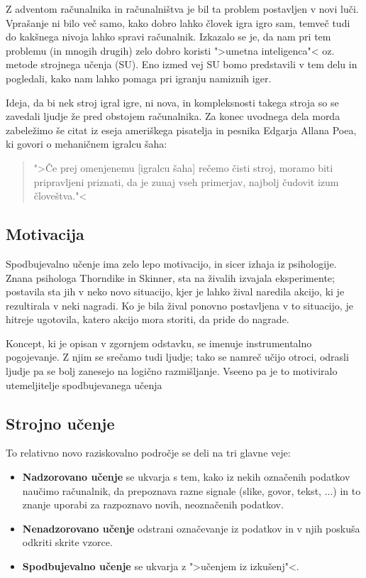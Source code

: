 \documentclass[12pt,a4paper]{amsart}
\theoremstyle{definition} %
\theoremstyle{plain} %
\begin{document}
Z adventom računalnika in računalništva je bil ta problem postavljen v novi luči. Vprašanje
ni bilo več samo, kako dobro lahko človek igra igro sam, temveč tudi do kakšnega nivoja 
lahko spravi računalnik. Izkazalo se je, da nam pri tem problemu (in mnogih drugih) zelo dobro
koristi ">umetna inteligenca"< oz. metode strojnega učenja (SU). Eno izmed vej SU bomo 
predstavili v tem delu in pogledali, kako nam lahko pomaga pri igranju namiznih iger.

Ideja, da bi nek stroj igral igre, ni nova, in kompleksnosti takega stroja so se zavedali ljudje
že pred obstojem računalnika. 
Za konec uvodnega dela morda zabeležimo še citat iz eseja ameriškega pisatelja in pesnika 
Edgarja Allana Poea, ki govori o mehaničnem igralcu šaha: 

\begin{quotation}
    ">Če prej omenjenemu [igralcu šaha] rečemo čisti stroj, moramo biti pripravljeni priznati, da je
    zunaj vseh primerjav, najbolj čudovit izum človeštva."<
\end{quotation}

\subsection{Motivacija}
Spodbujevalno učenje ima zelo lepo motivacijo, in sicer izhaja iz psihologije. Znana psihologa 
Thorndike in Skinner, sta na živalih izvajala eksperimente; postavila sta jih v neko novo 
situacijo, kjer je lahko žival naredila akcijo, ki je rezultirala v neki nagradi. Ko je bila
žival ponovno postavljena v to situacijo, je hitreje ugotovila, katero akcijo mora storiti, da
pride do nagrade.

Koncept, ki je opisan v zgornjem odstavku, se imenuje instrumentalno pogojevanje. Z njim se 
srečamo tudi ljudje; tako se namreč učijo otroci, odrasli ljudje pa se bolj zanesejo na 
logično razmišljanje. Vseeno pa je to motiviralo utemeljitelje spodbujevanega učenja

\subsection{Strojno učenje}
To relativno novo raziskovalno področje se deli na tri glavne veje:
\begin{itemize}
    \item \textbf{Nadzorovano učenje} se ukvarja s tem, kako iz nekih označenih podatkov 
            naučimo računalnik, da prepoznava razne signale (slike, govor, tekst, ...)
            in to znanje uporabi za razpoznavo novih, neoznačenih podatkov.
    \item \textbf{Nenadzorovano učenje} odstrani označevanje iz podatkov in v njih poskuša 
            odkriti skrite vzorce.
    \item \textbf{Spodbujevalno učenje} se ukvarja z ">učenjem iz izkušenj"<.
\end{itemize}
\end{document}
